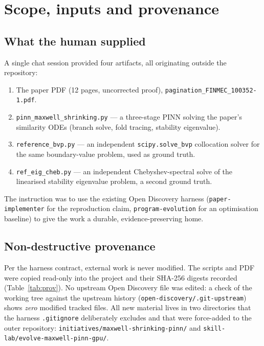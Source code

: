 \documentclass[11pt,a4paper]{article}
\newcommand{\code}[1]{\texttt{\small #1}}
\begin{document}
\tableofcontents
\clearpage

\section{Scope, inputs and provenance}

\subsection{What the human supplied}
A single chat session provided four artifacts, all originating outside the repository:

\begin{enumerate}[leftmargin=1.4em,itemsep=2pt]
  \item The paper PDF (12 pages, uncorrected proof), \code{pagination\_FINMEC\_100352-1.pdf}.
  \item \code{pinn\_maxwell\_shrinking.py} --- a three-stage PINN solving the paper's
        similarity ODEs (branch solve, fold tracing, stability eigenvalue).
  \item \code{reference\_bvp.py} --- an independent \code{scipy.solve\_bvp} collocation
        solver for the same boundary-value problem, used as ground truth.
  \item \code{ref\_eig\_cheb.py} --- an independent Chebyshev-spectral solve of the
        linearised stability eigenvalue problem, a second ground truth.
\end{enumerate}

\noindent The instruction was to use the existing Open Discovery harness
(\code{paper-implementer} for the reproduction claim, \code{program-evolution} for an
optimisation baseline) to give the work a durable, evidence-preserving home.

\subsection{Non-destructive provenance}
Per the harness contract, external work is never modified. The scripts and PDF were copied
read-only into the project and their SHA-256 digests recorded (Table~\ref{tab:prov}).
No upstream Open Discovery file was edited: a check of the working tree against the
upstream history (\code{open-discovery/.git-upstream}) shows \emph{zero} modified tracked
files. All new material lives in two directories that the harness \code{.gitignore}
deliberately excludes and that were force-added to the outer repository:
\code{initiatives/maxwell-shrinking-pinn/} and \code{skill-lab/evolve-maxwell-pinn-gpu/}.
\end{document}
